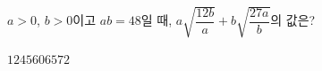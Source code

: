 $a>0$, $b>0$이고 $ab=48$일 때, $a\sqrt{\dfrac{12b}{a}}+b\sqrt{\dfrac{27a}{b}}$의 값은?
\begin{choices32}{$12$}{$45$}{$60$}{$65$}{$72$}\end{choices32}
